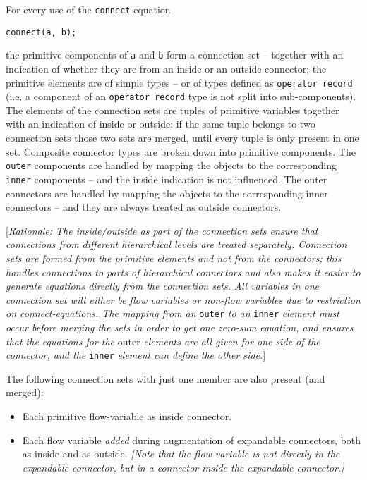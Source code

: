 For every use of the \lstinline!connect!-equation
\begin{lstlisting}[language=modelica]
connect(a, b);
\end{lstlisting}

the primitive components of \lstinline!a! and \lstinline!b! form a connection set -- together
with an indication of whether they are from an inside or an outside
connector; the primitive elements are of simple types -- or of types
defined as \lstinline!operator record! (i.e. a component of an \lstinline!operator record! type
is not split into sub-components). The elements of the connection sets
are tuples of primitive variables together with an indication of inside
or outside; if the same tuple belongs to two connection sets those two
sets are merged, until every tuple is only present in one set. Composite
connector types are broken down into primitive components. The \lstinline!outer!
components are handled by mapping the objects to the corresponding \lstinline!inner!
components -- and the inside indication is not influenced. The outer
connectors are handled by mapping the objects to the corresponding inner
connectors -- and they are always treated as outside connectors.

{[}\emph{Rationale: The inside/outside as part of the connection sets
ensure that connections from different hierarchical levels are treated
separately. Connection sets are formed from the primitive elements and
not from the connectors; this handles connections to parts of
hierarchical connectors and also makes it easier to generate equations
directly from the connection sets. All variables in one connection set
will either be flow variables or non-flow variables due to restriction
on connect-equations. The mapping from an} \lstinline!outer! \emph{to an} \lstinline!inner!
\emph{element must occur before merging the sets in order to get one
zero-sum equation, and ensures that the equations for the} outer
\emph{elements are all given for one side of the connector, and the}
\lstinline!inner! \emph{element can define the other side.}{]}

The following connection sets with just one member are also present (and
merged):

\begin{itemize}
\item
  Each primitive flow-variable as inside connector.
\item
  Each flow variable \emph{added} during augmentation of expandable
  connectors, both as inside and as outside. \emph{{[}Note that the flow
  variable is not directly in the expandable connector, but in a
  connector inside the expandable connector.{]}}
\end{itemize}

